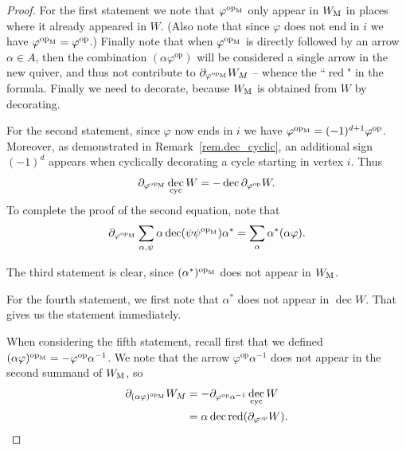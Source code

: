\documentclass[a4paper,11pt]{amsart}
\theoremstyle{definition}
\DeclareMathOperator{\op}{op}
\DeclareMathOperator{\red}{red}
\DeclareMathOperator{\dec}{dec}
\newcommand{\m}{_{\rm M}}
\numberwithin{theorem}{section}
\begin{document}
\begin{proof}
For the first statement we note that $\varphi^{\op\m}$ only appear in $W\m$ in places where it already appeared in $W$. (Also note that since $\varphi$ does not end in $i$ we have $\varphi^{\op\m} = \varphi^{\op}$.) Finally note that when $\varphi^{\op\m}$ is directly followed by an arrow $\alpha \in A$, then the combination $(\alpha \varphi^{\op})$ will be considered a single arrow in the new quiver, and thus not contribute to $\partial_{\varphi^{\op\m}} W_M$ -- whence the ``$\red$" in the formula. Finally we need to decorate, because $W\m$ is obtained from $W$ by decorating.

For the second statement, since $\varphi$ now ends in $i$ we have $\varphi^{\op\m} = (-1)^{d+1} \varphi^{\op}$. Moreover, as demonstrated in Remark~\ref{rem.dec_cyclic}, an additional sign $(-1)^d$ appears when cyclically decorating a cycle starting in vertex $i$. Thus
\[ \partial_{\varphi^{\op\m}} \dec_{\rm cyc} W = - \dec \partial_{\varphi^{\op}} W. \]
To complete the proof of the second equation, note that
\[ \partial_{\varphi^{\op\m}} \sum_{\alpha, \psi} \alpha \dec( \psi \psi^{\op\m} ) \alpha^* = \sum_{\alpha} \alpha^* (\alpha \varphi). \]

The third statement is clear, since $(\alpha^*)^{\op\m}$ does not appear in $W\m$.

For the fourth statement, we first note that $\alpha^*$ does not appear in $\dec W$. That gives us the statement immediately.

When considering the fifth statement, recall first that we defined $(\alpha \varphi)^{\op\m} = - \varphi^{\op} \alpha^{-1}$. We note that the arrow $\varphi^{\op} \alpha^{-1}$ does not appear in the second summand of $W\m$, so
\begin{align*}
\partial_{(\alpha \varphi)^{\op\m}} W_M & = - \partial_{\varphi^{\op} \alpha^{-1}} \dec_{\rm cyc} W \\
& = \alpha \dec \red (\partial_{\varphi^{\op}} W).
\end{align*}


\end{proof}
\end{document}

